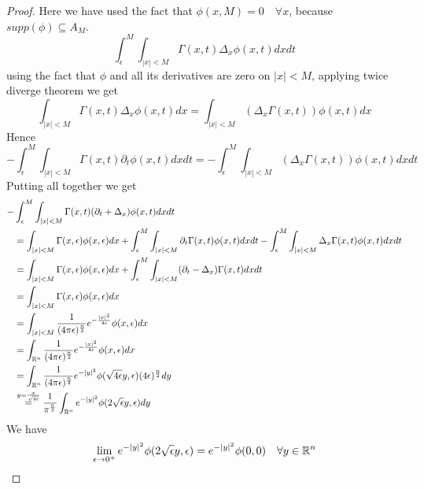 \begin{ProofBox}
\begin{proof}
        Here we have used the fact that $\phi(x,M) = 0 \quad \forall x$, because $supp(\phi) \subseteq A_M$.
        \begin{equation*}
            \int_\epsilon^M \int_{|x| < M} \Gamma(x,t) \Delta_x \phi(x,t) dx dt 
        \end{equation*}
        using the fact that $\phi$ and all its derivatives are zero on $|x|<M$, applying twice diverge theorem we get 
        \begin{equation*}
            \int_{|x| < M} \Gamma(x,t) \Delta_x \phi(x,t) dx = \int_{|x| < M} (\Delta_x \Gamma(x,t)) \phi(x,t) dx 
        \end{equation*}
        Hence 
        \begin{equation*}
            - \int_\epsilon^M \int_{|x|<M} \Gamma (x,t) \partial_t\phi(x,t) dx dt = -\int_\epsilon^M \int_{|x|<M} (\Delta_x \Gamma(x,t)) \phi(x,t) dx dt 
        \end{equation*}
        Putting all together we get 
        \begin{align*}
            -&\int_\epsilon^M \int_{|x| < M} \Gamma(x,t) (\partial_t + \Delta_x) \phi(x,t) dx dt \\
            &= \int_{|x| < M} \Gamma(x,\epsilon) \phi(x,\epsilon) dx + \int_\epsilon^M \int_{|x|< M} \partial_t \Gamma(x,t) \phi(x,t) dx dt - \int_\epsilon^M \int_{|x| < M} \Delta_x \Gamma(x,t) \phi(x,t) dx dt \\
            &= \int_{|x| < M} \Gamma(x,\epsilon) \phi(x,\epsilon) dx + \int_\epsilon^M \int_{|x| < M} (\partial_t - \Delta_x) \Gamma(x,t) dx dt \\
            &= \int_{|x| < M} \Gamma(x,\epsilon) \phi(x,\epsilon) dx \\
            &= \int_{|x| < M}  \frac{1}{(4 \pi \epsilon)^\frac{n}{2}} e^{- \frac{|x|^2}{4 \epsilon}} \phi(x,\epsilon)dx \\
            &= \int_{\mathbb{R}^n} \frac{1}{(4 \pi \epsilon)^\frac{n}{2}} e^{- \frac{|x|^2}{4 \epsilon}} \phi(x,\epsilon) dx \\
            &= \int_{\mathbb{R}^n} \frac{1}{(4 \pi \epsilon)^\frac{n}{2}} e^{-|y|^2} \phi(\sqrt{4 \epsilon}y,\epsilon) (4 \epsilon)^\frac{n}{2} dy \\
            &\stackrel{y=\frac{x}{\sqrt{4 \epsilon}}}= \frac{1}{\pi^\frac{n}{2}} \int_{\mathbb{R}^n} e^{- |y|^2} \phi (2 \sqrt{\epsilon}y, \epsilon) dy 
        \end{align*}
        We have 
        \begin{equation*}
            \lim_{\epsilon \rightarrow 0^+}  e^{- |y|^2} \phi (2 \sqrt{\epsilon}y, \epsilon) =  e^{- |y|^2} \phi (0,0) \quad \forall y \in \mR^n

\end{equation*}
\end{proof}
\end{ProofBox}
